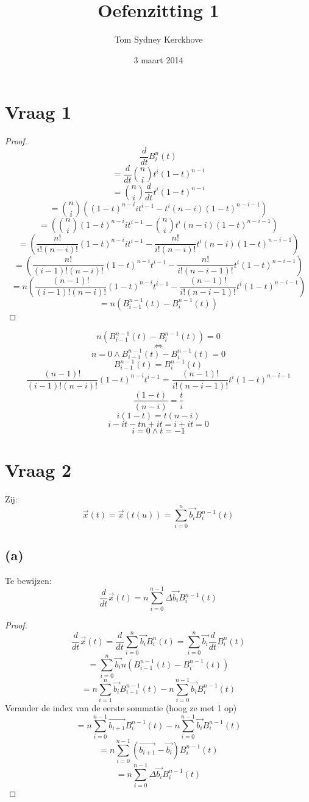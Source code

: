 \documentclass[10pt,a4paper]{article}
\title{Oefenzitting 1}
\author{Tom Sydney Kerckhove}
\date{3 maart 2014}
\begin{document}
\maketitle

\section{Vraag 1}
\begin{proof}
\[
\frac{d}{dt}B^{n}_{i}(t)
\]
\[
= \frac{d}{dt}\binom{n}{i}t^i(1-t)^{n-i}
\]
\[
= \binom{n}{i}\frac{d}{dt}t^i(1-t)^{n-i}
\]
\[
= \binom{n}{i}
\left(
(1-t)^{n-i}it^{i-1} - t^i(n-i)(1-t)^{n-i-1}
\right)
\]
\[
=
\left(
\binom{n}{i}(1-t)^{n-i}it^{i-1} - \binom{n}{i}t^i(n-i)(1-t)^{n-i-1}
\right)
\]
\[
=
\left(
\frac{n!}{i!(n-i)!}(1-t)^{n-i}it^{i-1} - \frac{n!}{i!(n-i)!}t^i(n-i)(1-t)^{n-i-1}
\right)
\]
\[
=
\left(
\frac{n!}{(i-1)!(n-i)!}(1-t)^{n-i}t^{i-1} - \frac{n!}{i!(n-i-1)!}t^i(1-t)^{n-i-1}
\right)
\]
\[
=
n
\left(
\frac{(n-1)!}{(i-1)!(n-i)!}(1-t)^{n-i}t^{i-1} - \frac{(n-1)!}{i!(n-i-1)!}t^i(1-t)^{n-i-1}
\right)
\]
\[
=
n
\left(
B^{n-1}_{i-1}(t) - B^{n-1}_{i}(t)
\right)
\]
\end{proof}
\[
n
\left(
B^{n-1}_{i-1}(t) - B^{n-1}_{i}(t)
\right)
=0
\]
\[
\Leftrightarrow
\] 
\[
n=0 \wedge B^{n-1}_{i-1}(t) - B^{n-1}_{i}(t) = 0
\]
\[
B^{n-1}_{i-1}(t) = B^{n-1}_{i}(t)
\]
\[
\frac{(n-1)!}{(i-1)!(n-i)!}(1-t)^{n-i}t^{i-1} = \frac{(n-1)!}{i!(n-i-1)!}t^i(1-t)^{n-i-1}
\]
\[
\frac{(1-t)}{(n-i)} = \frac{t}{i}
\]
\[
i(1-t)=t(n-i) 
\]
\[
i-it-tn+it= i+it =0
\]
\[
i=0 \wedge t=-1
\]

\section{Vraag 2}
Zij:
\[
\vec{x}(t) = \vec{x}(t(u)) = \sum_{i=0}^{n}\vec{b_{i}}B_{i}^{n-1}(t)
\]
\subsection*{(a)}
Te bewijzen:
\[
\frac{d}{dt}\vec{x}(t) = n\sum_{i=0}^{n-1}\Delta\vec{b_i}B_{i}^{n-1}(t)
\]
\begin{proof}
\[
\frac{d}{dt}\vec{x}(t)
= \frac{d}{dt}\sum_{i=0}^{n}\vec{b_{i}}B_{i}^{n}(t)
= \sum_{i=0}^{n}\vec{b_{i}} \frac{d}{dt}B_{i}^{n}(t)
\]
\[
= \sum_{i=0}^{n}\vec{b_{i}}n
\left(
B^{n-1}_{i-1}(t) - B^{n-1}_{i}(t)
\right)
\]
\[
= n
\sum_{i=1}^{n}
\vec{b_{i}}B^{n-1}_{i-1}(t)
-n 
\sum_{i=0}^{n-1}
\vec{b_{i}}B^{n-1}_{i}(t)
\]
Verander de index van de eerste sommatie (hoog ze met 1 op)
\[
= n
\sum_{i=0}^{n-1}
\vec{b_{i+1}}B^{n-1}_{i}(t)
-n 
\sum_{i=0}^{n-1}
\vec{b_{i}}B^{n-1}_{i}(t)
\]
\[
= n
\sum_{i=0}^{n-1}
(\vec{b_{i+1}}-\vec{b_{i}})B^{n-1}_{i}(t)
\]
\[
= n
\sum_{i=0}^{n-1}\Delta\vec{b_{i}}B^{n-1}_{i}(t)
\]
\end{proof}
\end{document}
